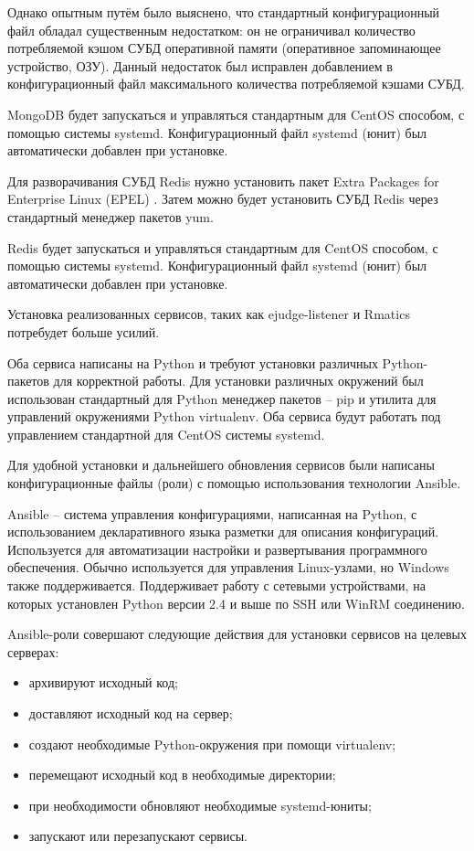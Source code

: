 Однако опытным путём было выяснено, что стандартный конфигурационный файл
обладал существенным недостатком: он не ограничивал количество потребляемой кэшом СУБД оперативной памяти (оперативное запоминающее устройство, ОЗУ).
Данный недостаток был исправлен добавлением в конфигурационный файл максимального количества потребляемой кэшами СУБД.

MongoDB будет запускаться и управляться стандартным для CentOS способом,
с помощью системы systemd.
Конфигурационный файл systemd (юнит) был автоматически добавлен при установке.

Для разворачивания СУБД Redis нужно установить пакет Extra Packages for Enterprise Linux (EPEL) \cite{redis_install}.
Затем можно будет установить СУБД Redis через стандартный менеджер пакетов yum.

Redis будет запускаться и управляться стандартным для CentOS способом,
с помощью системы systemd.
Конфигурационный файл systemd (юнит) был автоматически добавлен при установке.

Установка реализованных сервисов, таких как ejudge-listener и Rmatics потребудет больше усилий.

Оба сервиса написаны на Python и требуют установки различных Python-пакетов для корректной работы.
Для установки различных окружений был использован стандартный для Python менеджер пакетов -- pip и утилита для управлений окружениями Python virtualenv. Оба сервиса будут работать под управлением стандартной для CentOS системы systemd.

Для удобной установки и дальнейшего обновления сервисов были написаны конфигурационные файлы (роли) с помощью использования технологии Ansible.

Ansible -- система управления конфигурациями, написанная на Python, с использованием декларативного языка разметки для описания конфигураций.
Используется для автоматизации настройки и развертывания программного обеспечения. 
Обычно используется для управления Linux-узлами, но Windows также поддерживается. 
Поддерживает работу с сетевыми устройствами, на которых установлен Python версии 2.4 и выше по SSH или WinRM соединению.

Ansible-роли совершают следующие действия для установки сервисов на целевых серверах:

\begin{itemize}
    \item архивируют исходный код;
    \item доставляют исходный код на сервер;
    \item создают необходимые Python-окружения при помощи virtualenv;
    \item перемещают исходный код в необходимые директории;
    \item при необходимости обновляют необходимые systemd-юниты;
    \item запускают или перезапускают сервисы.
\end{itemize}


